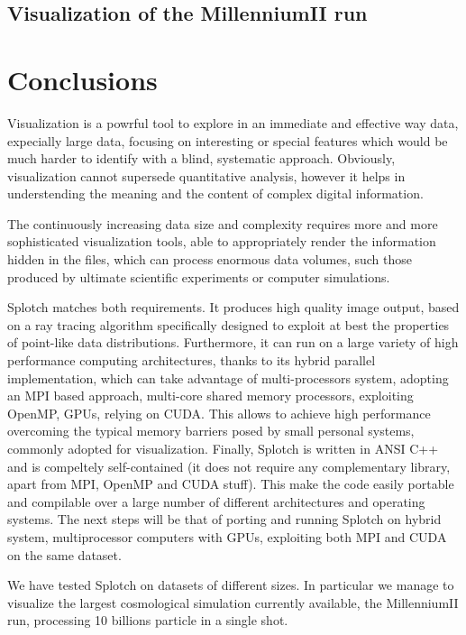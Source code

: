 \subsection{Visualization of the MillenniumII run}
\label{mII}



\section{Conclusions}
\label{conclusions}

Visualization is a powrful tool to explore in an immediate and 
effective way data, expecially large data, focusing on interesting or special features
which would be much harder to identify with a blind, systematic approach. 
Obviously, visualization cannot supersede quantitative analysis, however it helps in
understending the meaning and the content of complex digital information.

The continuously increasing data size and complexity requires more and more 
sophisticated visualization tools, able to appropriately render the information 
hidden in the files, which can process enormous data volumes, such those produced 
by ultimate scientific experiments or computer simulations.

Splotch matches both requirements. It produces high quality image output,
based on a ray tracing algorithm specifically designed to exploit at best the 
properties of point-like data distributions. Furthermore, it can run on a large 
variety of high performance computing architectures, thanks to its hybrid
parallel implementation, which can take advantage of multi-processors system, adopting
an MPI based approach, multi-core shared memory processors, exploiting OpenMP,
GPUs, relying on CUDA. This allows to achieve high performance overcoming the typical
memory barriers posed by small personal systems, commonly adopted for visualization.
Finally, Splotch is written in ANSI C++ and is compeltely self-contained (it does not
require any complementary library, apart from MPI, OpenMP and CUDA stuff). 
This make the code easily portable and compilable over a large number of different 
architectures and operating systems. The next steps will be that of porting and 
running Splotch on hybrid system, multiprocessor computers with GPUs, exploiting 
both MPI and CUDA on the same dataset.

We have tested Splotch on datasets of different sizes. In particular we manage to 
visualize the largest cosmological simulation currently available, the MillenniumII run, 
processing 10 billions particle in a single shot.


